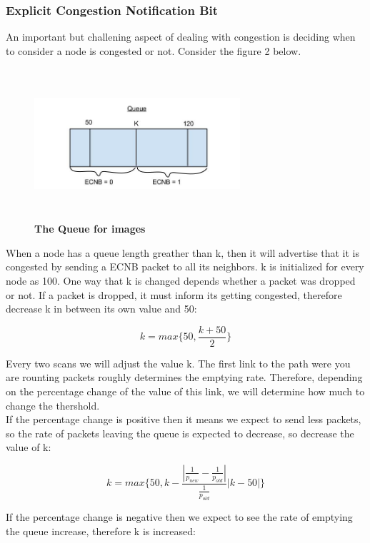 \documentclass[letterpaper]{article}
\begin{document}
\subsubsection{Explicit Congestion Notification Bit}

An important but challening aspect of dealing with congestion is deciding when to consider a node is congested or not. 
Consider the figure 2 below.
\\
 
\begin{figure}[ht!]
\centering
\includegraphics[width=3in, height=2.2in]{Queue4.jpg}
\caption{\textbf{The Queue for images}}
\end{figure}

\noindent When a node has a queue length greather than k, then it will advertise that it is congested by sending
a ECNB packet to all its neighbors. k is initialized for every node as 100. One way that k is changed depends 
whether a packet was dropped or not. If a packet is
dropped, it must inform its getting congested, therefore decrease k 
in between its own value and 50:

$$ k = max\{50, \frac{k + 50}{2} \}$$

\noindent Every two scans we will adjust the value k. The first link to the path were you are rounting packets
roughly determines the emptying rate. Therefore, depending on the percentage change of the value of this link, 
we will determine how much to change the thershold.
\\

\noindent If the percentage change is positive then it means we expect to send less packets, so the rate of packets
leaving the queue is expected to decrease, so decrease the value of k:

$$ k = max\{50, k -  \frac{|\frac{1}{p_{new}} - \frac{1}{p_{old}}|}{\frac{1}{p_{old}}}|k - 50|   \}$$ 

\noindent If the percentage change is negative then we expect to see the rate of emptying the queue increase, therefore k is increased:
\end{document}
